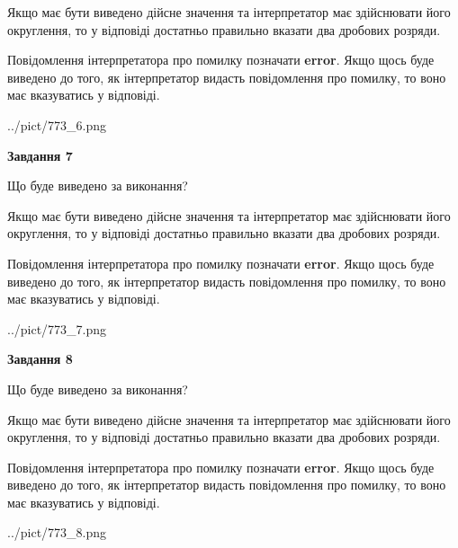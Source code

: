 \documentclass[12pt, ukrainian]{article}
\begin{document}
{\begin {Large}
Якщо має бути виведено дійсне значення та інтерпретатор має здійснювати його округлення, 
то у відповіді достатньо правильно вказати два дробових розряди.

Повідомлення інтерпретатора про помилку позначати \textbf{error}.
Якщо щось буде виведено до того, як інтерпретатор видасть повідомлення про помилку, 
то воно має вказуватись у відповіді. \par

\begin{center}
	{../pict/773_6.png}
\end{center}
\newpage

{\begin {center}\textbf{Завдання 7}\end {center}}\par
Що буде виведено за виконання? \par

Якщо має бути виведено дійсне значення та інтерпретатор має здійснювати його округлення, 
то у відповіді достатньо правильно вказати два дробових розряди.

Повідомлення інтерпретатора про помилку позначати \textbf{error}.
Якщо щось буде виведено до того, як інтерпретатор видасть повідомлення про помилку, 
то воно має вказуватись у відповіді. \par

\begin{center}
	{../pict/773_7.png}
\end{center}
\newpage

{\begin {center}\textbf{Завдання 8}\end {center}}\par
Що буде виведено за виконання? \par

Якщо має бути виведено дійсне значення та інтерпретатор має здійснювати його округлення, 
то у відповіді достатньо правильно вказати два дробових розряди.

Повідомлення інтерпретатора про помилку позначати \textbf{error}.
Якщо щось буде виведено до того, як інтерпретатор видасть повідомлення про помилку, 
то воно має вказуватись у відповіді. \par

\begin{center}
	{../pict/773_8.png}
\end{center}
\newpage


\end{Large}}
\end{document}
